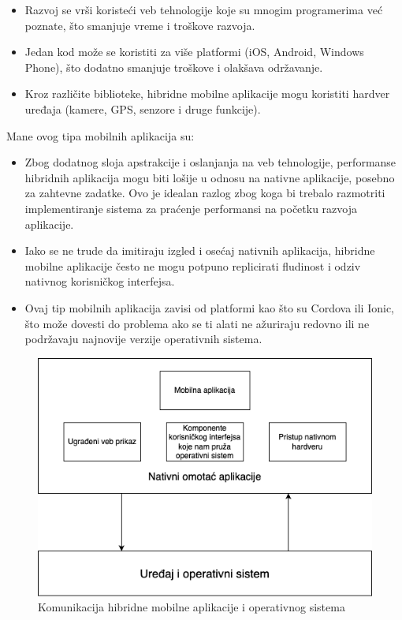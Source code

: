 \documentclass[12pt,oneside]{memoir}
\begin{document}
\begin{itemize}
    \item Razvoj se vrši koristeći veb tehnologije koje su mnogim programerima već poznate, što smanjuje vreme i troškove razvoja.
    \item Jedan kod može se koristiti za više platformi (iOS, Android, Windows Phone), što dodatno smanjuje troškove i olakšava održavanje.
    \item Kroz različite biblioteke, hibridne mobilne aplikacije mogu koristiti hardver uređaja (kamere, GPS, senzore i druge funkcije).
\end{itemize}
Mane ovog tipa mobilnih aplikacija su:
\begin{itemize}
    \item Zbog dodatnog sloja apstrakcije i oslanjanja na veb tehnologije, performanse hibridnih aplikacija mogu biti lošije u odnosu na nativne aplikacije, posebno za zahtevne zadatke. Ovo je idealan razlog zbog koga bi trebalo razmotriti implementiranje sistema za praćenje performansi na početku razvoja aplikacije.
    \item Iako se ne trude da imitiraju izgled i osećaj nativnih aplikacija, hibridne mobilne aplikacije često ne mogu potpuno replicirati fludinost i odziv nativnog korisničkog interfejsa.
    \item Ovaj tip mobilnih aplikacija zavisi od platformi kao što su Cordova ili Ionic, što može dovesti do problema ako se ti alati ne ažuriraju redovno ili ne podržavaju najnovije verzije operativnih sistema.
\end{itemize}

\begin{figure}[h]
    \centering
    \includegraphics[scale=0.5]{docs/images/chapterTwo/hibridnaMobilnaAplikacija.png}
    \caption{Komunikacija hibridne mobilne aplikacije i operativnog sistema}
    \label{fig:hibridnaMobilnaAplikacija}
\end{figure}
\end{document}
